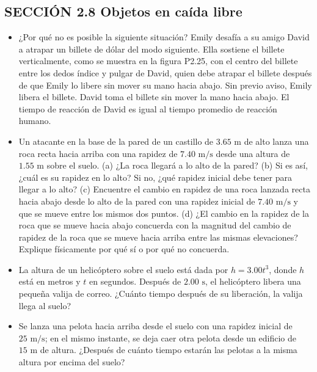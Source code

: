 \documentclass[11pt,a4paper]{article}
\begin{document}
\newpage

\subsection*{SECCIÓN 2.8 Objetos en caída libre}

\begin{itemize}
    \item[\textbf{25.}] ¿Por qué no es posible la siguiente situación? Emily desafía a su amigo David a atrapar un billete de dólar del modo siguiente. Ella sostiene el billete verticalmente, como se muestra en la figura P2.25, con el centro del billete entre los dedos índice y pulgar de David, quien debe atrapar el billete después de que Emily lo libere sin mover su mano hacia abajo. Sin previo aviso, Emily libera el billete. David toma el billete sin mover la mano hacia abajo. El tiempo de reacción de David es igual al tiempo promedio de reacción humano.
    \vspace*{6cm}

    \item[\textbf{26.}] Un atacante en la base de la pared de un castillo de $3.65 \text{ m}$ de alto lanza una roca recta hacia arriba con una rapidez de $7.40 \text{ m/s}$ desde una altura de $1.55 \text{ m}$ sobre el suelo. (a) ¿La roca llegará a lo alto de la pared? (b) Si es así, ¿cuál es su rapidez en lo alto? Si no, ¿qué rapidez inicial debe tener para llegar a lo alto? (c) Encuentre el cambio en rapidez de una roca lanzada recta hacia abajo desde lo alto de la pared con una rapidez inicial de $7.40 \text{ m/s}$ y que se mueve entre los mismos dos puntos. (d) ¿El cambio en la rapidez de la roca que se mueve hacia abajo concuerda con la magnitud del cambio de rapidez de la roca que se mueve hacia arriba entre las mismas elevaciones? Explique físicamente por qué sí o por qué no concuerda.
    \vspace*{8cm}

    \item[\textbf{27.}] La altura de un helicóptero sobre el suelo está dada por $h = 3.00t^3$, donde $h$ está en metros y $t$ en segundos. Después de $2.00 \text{ s}$, el helicóptero libera una pequeña valija de correo. ¿Cuánto tiempo después de su liberación, la valija llega al suelo?
    \vspace*{6cm}

    \item[\textbf{28.}] Se lanza una pelota hacia arriba desde el suelo con una rapidez inicial de $25 \text{ m/s}$; en el mismo instante, se deja caer otra pelota desde un edificio de $15 \text{ m}$ de altura. ¿Después de cuánto tiempo estarán las pelotas a la misma altura por encima del suelo?
    \vspace*{6cm}
\end{itemize}
\end{document}
